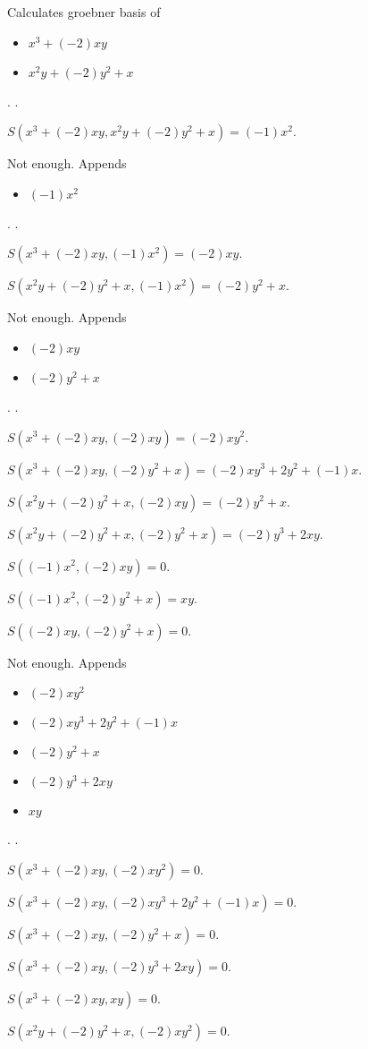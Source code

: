 \documentclass{jsarticle}
\begin{document}
Calculates groebner basis of 
\begin{itemize}
\item $x^{3}+(-2)xy$
\item $x^{2}y+(-2)y^{2}+x$
\end{itemize}  . 
.  

$S(x^{3}+(-2)xy, x^{2}y+(-2)y^{2}+x) = (-1)x^{2}$.  

Not enough.  Appends \begin{itemize}
\item $(-1)x^{2}$
\end{itemize}  . 
.  

$S(x^{3}+(-2)xy, (-1)x^{2}) = (-2)xy$.  

$S(x^{2}y+(-2)y^{2}+x, (-1)x^{2}) = (-2)y^{2}+x$.  

Not enough.  Appends \begin{itemize}
\item $(-2)xy$
\item $(-2)y^{2}+x$
\end{itemize}  . 
.  

$S(x^{3}+(-2)xy, (-2)xy) = (-2)xy^{2}$.  

$S(x^{3}+(-2)xy, (-2)y^{2}+x) = (-2)xy^{3}+2y^{2}+(-1)x$.  

$S(x^{2}y+(-2)y^{2}+x, (-2)xy) = (-2)y^{2}+x$.  

$S(x^{2}y+(-2)y^{2}+x, (-2)y^{2}+x) = (-2)y^{3}+2xy$.  

$S((-1)x^{2}, (-2)xy) = 0$.  

$S((-1)x^{2}, (-2)y^{2}+x) = xy$.  

$S((-2)xy, (-2)y^{2}+x) = 0$.  

Not enough.  Appends \begin{itemize}
\item $(-2)xy^{2}$
\item $(-2)xy^{3}+2y^{2}+(-1)x$
\item $(-2)y^{2}+x$
\item $(-2)y^{3}+2xy$
\item $xy$
\end{itemize}  . 
.  

$S(x^{3}+(-2)xy, (-2)xy^{2}) = 0$.  

$S(x^{3}+(-2)xy, (-2)xy^{3}+2y^{2}+(-1)x) = 0$.  

$S(x^{3}+(-2)xy, (-2)y^{2}+x) = 0$.  

$S(x^{3}+(-2)xy, (-2)y^{3}+2xy) = 0$.  

$S(x^{3}+(-2)xy, xy) = 0$.  

$S(x^{2}y+(-2)y^{2}+x, (-2)xy^{2}) = 0$.  
\end{document}
